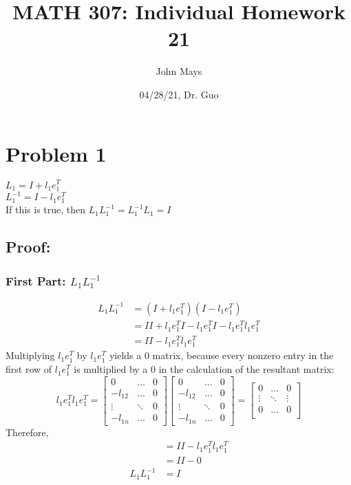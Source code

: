 \documentclass[fleqn]{article}
\title{\textbf{MATH 307: Individual Homework 21}}
\author{John Mays}
\date{04/28/21, Dr. Guo}
\begin{document}
\maketitle

\section*{Problem 1}
$L_1=I+l_1e_1^{T}$\\
$L_1^{-1}=I-l_1 e_1^{T}$\\
If this is true, then $L_1 L_1^{-1} = L_1^{-1} L_1  = I$
\subsection*{Proof: }
\subsubsection*{First Part: $L_1 L_1^{-1}$}
\begin{equation*}
    \begin{split}
        L_1 L_1^{-1} &= (I+l_1e_1^{T})(I-l_1 e_1^{T})\\
        &= II + l_1e_1^{T}I-l_1e_1^{T}I - l_1 e_1^{T}l_1 e_1^{T}\\
        &= II - l_1 e_1^{T}l_1 e_1^{T}
    \end{split}
\end{equation*}
Multiplying $l_1 e_1^{T}$ by $l_1 e_1^{T}$ yields a 0 matrix, because every nonzero entry in the first row of $l_1 e_1^{T}$ is multiplied by a $0$ in the calculation of the resultant matrix:
\begin{equation*}
        l_1 e_1^{T}l_1 e_1^{T} = \begin{bmatrix}0 & \dots & 0\\ -l_{12} & \dots & 0 \\ \vdots & \ddots & 0\\ -l_{1n} & \dots & 0 \end{bmatrix}\begin{bmatrix}0 & \dots & 0\\ -l_{12} & \dots & 0 \\ \vdots & \ddots & 0\\ -l_{1n} & \dots & 0 \end{bmatrix} = \begin{bmatrix}0 & \dots & 0\\\vdots & \ddots & \vdots\\0 & \dots & 0\\\end{bmatrix}
\end{equation*}
Therefore, 
\begin{equation*}
    \begin{split}
        &= II - l_1 e_1^{T}l_1 e_1^{T}\\
        &= II - 0\\
        L_1 L_1^{-1} &= I
    \end{split}
\end{equation*}
\end{document}
